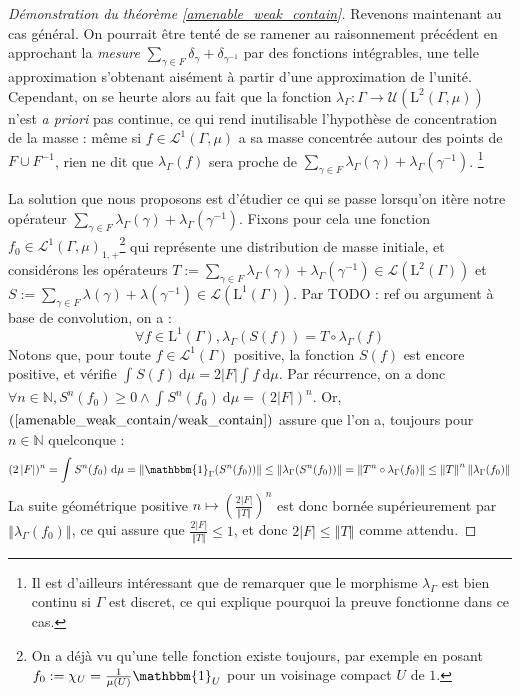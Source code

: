 \documentclass[a4paper,12pt]{article}
\newcommand{\N}{\mathbb{N}}
\newcommand{\norm}[1]{\left\Vert #1\right\Vert}
\newcommand{\abs}[1]{\left\vert#1\right\vert}
\newcommand{\card}[1]{\abs{#1}}
\newcommand{\indic}{\mathbbm{1}}
\newcommand{\integral}[4]{\int_{#1}^{#2} #3~\mathrm{d}#4}
\newcommand{\inv}{^{-1}}
\newcommand{\comp}{\circ}
\newcommand{\TODO}[1]{{\color{red}TODO :} #1}
\begin{document}
\begin{proof}[Démonstration du théorème \ref{amenable_weak_contain}]
    Revenons maintenant au cas général. On pourrait être tenté de se ramener au raisonnement précédent 
    en approchant la \emph{mesure} $\sum_{\gamma\in F}\delta_\gamma + \delta_{\gamma\inv}$ par des fonctions intégrables,
    une telle approximation s'obtenant aisément à partir d'une approximation de l'unité. Cependant,
    on se heurte alors au fait que la fonction $\lambda_\Gamma : \Gamma \to \mathcal{U}(\mathrm{L}^2(\Gamma, \mu))$
    n'est \emph{a priori} pas continue, ce qui rend inutilisable l'hypothèse de concentration de la masse : 
    même si $f\in\mathscr{L}^1(\Gamma, \mu)$ a sa masse concentrée autour des points de $F\cup F\inv$,
    rien ne dit que $\lambda_\Gamma(f)$ sera proche de $\sum_{\gamma\in F}\lambda_\Gamma(\gamma) + \lambda_\Gamma(\gamma\inv)$. 
    \footnote{Il est d'ailleurs intéressant que de remarquer que le morphisme $\lambda_\Gamma$ est bien continu
    si $\Gamma$ est discret, ce qui explique pourquoi la preuve fonctionne dans ce cas.}

    La solution que nous proposons est d'étudier ce qui se passe lorsqu'on itère notre opérateur $\sum_{\gamma\in F}\lambda_\Gamma(\gamma) + \lambda_\Gamma(\gamma\inv)$.
    Fixons pour cela une fonction $f_0\in\mathscr{L}^1(\Gamma, \mu)_{1, +}$\footnote{On a déjà vu qu'une telle fonction existe toujours, par exemple en posant $f_0:=\chi_U=\frac{1}{\mu(U)}\indic_U$ pour 
    un voisinage compact $U$ de $1$.} qui représente une distribution de masse initiale, et considérons les opérateurs $T := \sum_{\gamma\in F}\lambda_\Gamma(\gamma) + \lambda_\Gamma(\gamma\inv) \in\mathcal{L}(\mathrm{L}^2(\Gamma))$
    et $S := \sum_{\gamma\in F}\lambda(\gamma) + \lambda(\gamma\inv) \in \mathcal{L}(\mathrm{L}^1(\Gamma))$. Par \TODO{ref ou argument à base de convolution}, on a :
    \begin{equation*}
        \forall f\in\mathrm{L}^1(\Gamma), \lambda_\Gamma(S(f)) = T \comp \lambda_\Gamma(f)
    \end{equation*}
    Notons que, pour toute $f\in\mathscr{L}^1(\Gamma)$ positive, la fonction $S(f)$ est encore positive, et vérifie $\integral{}{}{S(f)}{\mu} = 2\card{F}\integral{}{}{f}{\mu}$.
    Par récurrence, on a donc $\forall n\in\N, S^n(f_0)\geq0 \land \integral{}{}{S^n(f_0)}{\mu} = (2\card{F})^n$. Or, $(\ref{amenable_weak_contain/weak_contain})$
    assure que l'on a, toujours pour $n\in\N$ quelconque :
    \begin{equation*}
        (2\card{F})^n = \integral{}{}{S^n(f_0)}{\mu} = \norm{\indic_\Gamma(S^n(f_0))} \leq \norm{\lambda_\Gamma(S^n(f_0))} = \norm{T^n \comp \lambda_\Gamma(f_0)} \le \norm{T}^n \norm{\lambda_\Gamma(f_0)}
    \end{equation*}
    La suite géométrique positive $n\mapsto\left(\frac{2\card{F}}{\norm{T}}\right)^n$ est donc bornée supérieurement par $\norm{\lambda_\Gamma(f_0)}$, ce qui assure que $\frac{2\card{F}}{\norm{T}} \leq 1$,
    et donc $2\card{F}\leq\norm{T}$ comme attendu.


\end{proof}
\end{document}
